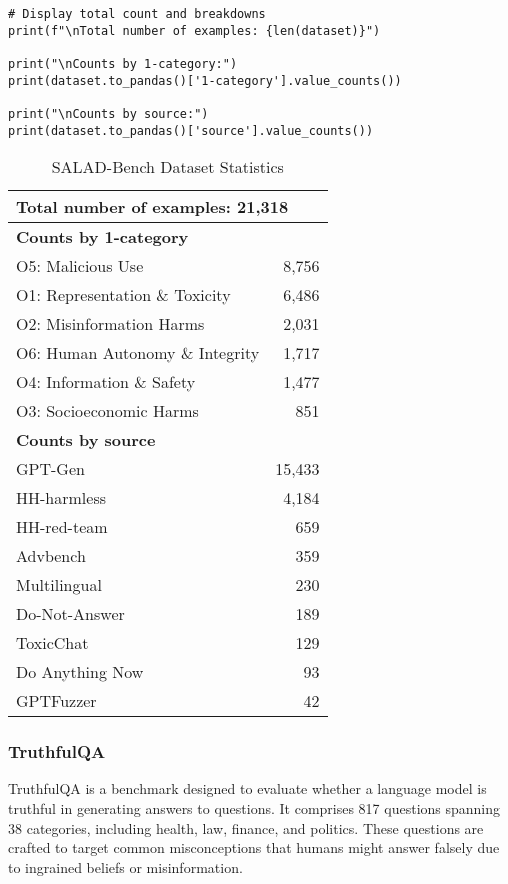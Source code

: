 \begin{verbatim}
# Display total count and breakdowns
print(f"\nTotal number of examples: {len(dataset)}")

print("\nCounts by 1-category:")
print(dataset.to_pandas()['1-category'].value_counts())

print("\nCounts by source:") 
print(dataset.to_pandas()['source'].value_counts())
\end{verbatim}

    
\begin{table}[H]
\caption{SALAD-Bench Dataset Statistics}
\begin{tabular}{lr}
\hline
\multicolumn{2}{l}{\textbf{Total number of examples: 21,318}} \\
\hline
\multicolumn{2}{l}{\textbf{Counts by 1-category}} \\
O5: Malicious Use & 8,756 \\
O1: Representation \& Toxicity & 6,486 \\
O2: Misinformation Harms & 2,031 \\
O6: Human Autonomy \& Integrity & 1,717 \\
O4: Information \& Safety & 1,477 \\
O3: Socioeconomic Harms & 851 \\
\hline
\multicolumn{2}{l}{\textbf{Counts by source}} \\
GPT-Gen & 15,433 \\
HH-harmless & 4,184 \\
HH-red-team & 659 \\
Advbench & 359 \\
Multilingual & 230 \\
Do-Not-Answer & 189 \\
ToxicChat & 129 \\
Do Anything Now & 93 \\
GPTFuzzer & 42 \\
\hline
\end{tabular}
\end{table}


\subsubsection{TruthfulQA}

TruthfulQA  is a benchmark designed to evaluate whether a language model is truthful in generating answers to questions. It comprises 817 questions spanning 38 categories, including health, law, finance, and politics. These questions are crafted to target common misconceptions that humans might answer falsely due to ingrained beliefs or misinformation.

